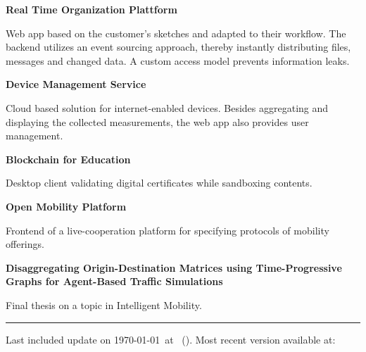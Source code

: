 \documentclass[12pt,a4paper,ragged2e,withhyper]{altacv} %
\begin{document}
\begin{paracol}{2}
\textbf{Real Time Organization Plattform}

Web app based on the customer's sketches and adapted to their workflow.
The backend utilizes an event sourcing approach,
thereby instantly distributing files, messages and changed data.
A custom access model prevents information leaks.

\smallskip


\medskip

\textbf{Device Management Service}

Cloud based solution for internet-enabled devices.
Besides aggregating and displaying the collected measurements,
the web app also provides user management.

\smallskip


\divider


\textbf{Blockchain for Education}

Desktop client validating digital certificates while sandboxing contents.

\smallskip


\medskip

\textbf{Open Mobility Platform}

Frontend of a live-cooperation platform for specifying protocols of mobility offerings.

\smallskip

 

\smallskip


\medskip



\textbf{Disaggregating Origin-Destination Matrices
using Time-Progressive Graphs for Agent-Based Traffic Simulations}

Final thesis on a topic in Intelligent Mobility.

\smallskip

 

\smallskip





\end{paracol}

\vfill
\hrule
\medskip
\small{
    Last included update on \today~at \DTMcurrenttime~(\DTMcurrentzone).
    Most recent version available at: 
}
\end{document}
